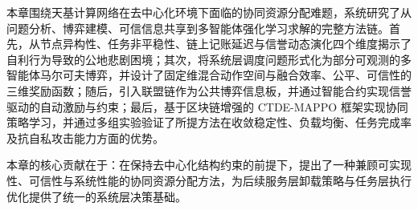 本章围绕天基计算网络在去中心化环境下面临的协同资源分配难题，系统研究了从问题分析、博弈建模、可信信息共享到多智能体强化学习求解的完整方法链。首先，从节点异构性、任务非平稳性、链上记账延迟与信誉动态演化四个维度揭示了自利行为导致的公地悲剧困境；其次，将系统层调度问题形式化为部分可观测的多智能体马尔可夫博弈，并设计了固定维混合动作空间与融合效率、公平、可信性的三维奖励函数；随后，引入联盟链作为公共博弈信息板，并通过智能合约实现信誉驱动的自动激励与约束；最后，基于区块链增强的 CTDE-MAPPO 框架实现协同策略学习，并通过多组实验验证了所提方法在收敛稳定性、负载均衡、任务完成率及抗自私攻击能力方面的优势。

本章的核心贡献在于：在保持去中心化结构约束的前提下，提出了一种兼顾可实现性、可信性与系统性能的协同资源分配方法，为后续服务层卸载策略与任务层执行优化提供了统一的系统层决策基础。
